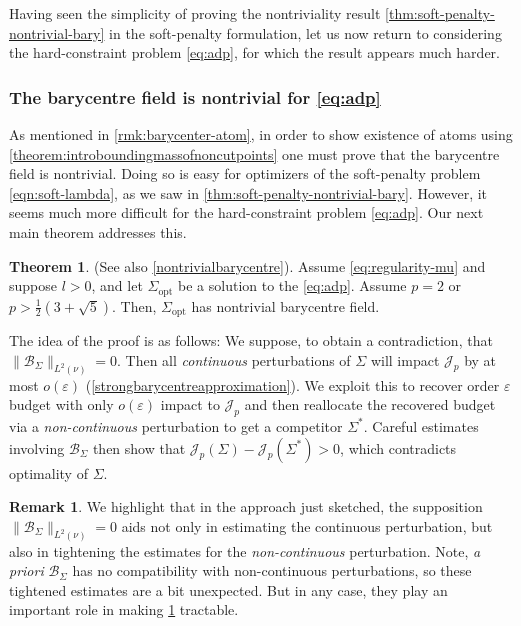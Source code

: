 \documentclass[preprint, reqno]{amsart}
\newcommand{\lbonpval}{\frac{1}{2}(3+\sqrt{5})}
\theoremstyle{definition}
\newtheorem{theorem}[definition]{Theorem}
\newtheorem{remark}[definition]{Remark}
\numberwithin{equation}{section}
\begin{document}
Having seen the simplicity of proving the nontriviality result
\cref{thm:soft-penalty-nontrivial-bary} in the soft-penalty
formulation, let us now return to considering the hard-constraint
problem \eqref{eq:adp}, for which the result appears much harder.


\subsubsection{The barycentre field is
  nontrivial for \eqref{eq:adp}} \label{sec:bary-nontrivial-summary}

As mentioned in \cref{rmk:barycenter-atom}, in order to show existence
of atoms using \cref{theorem:introboundingmassofnoncutpoints} one must
prove that the barycentre field is nontrivial. Doing so is easy for
optimizers of the soft-penalty problem \eqref{eqn:soft-lambda}, as we
saw in \cref{thm:soft-penalty-nontrivial-bary}. However, it seems much
more difficult for the hard-constraint problem \eqref{eq:adp}. Our
next main theorem addresses this.
\begin{theorem}\label{theorem:intronontrivialbarycentre} (See also
  \cref{nontrivialbarycentre}). Assume \eqref{eq:regularity-mu} and
  suppose $l > 0$, and let $\Sigma_{\mathrm{opt}}$ be a solution to
  the \eqref{eq:adp}. Assume $p = 2$ or $p > \lbonpval$. Then,
  $\Sigma_{\mathrm{opt}}$ has nontrivial barycentre field.
\end{theorem}

The idea of the proof is as follows: We suppose, to obtain a
contradiction, that $\lVert \mathcal B_\Sigma \rVert_{L^2(\nu)} = 0$.
Then all \emph{continuous} perturbations of $\Sigma$ will impact
$\mathscr J_p$ by at most $o(\varepsilon)$
(\cref{strongbarycentreapproximation}). We exploit this to recover
order $\varepsilon$ budget with only $o(\varepsilon)$ impact to
$\mathscr J_p$ and then reallocate the recovered budget via a
\emph{non-continuous} perturbation to get a competitor $\Sigma^*$.
Careful estimates involving $\mathcal B_\Sigma$ then show that
$\mathscr J_p(\Sigma) - \mathscr J_p(\Sigma^*) > 0$, which contradicts
optimality of $\Sigma$.
\begin{remark}
  We highlight that in the approach just sketched, the supposition
  $\lVert \mathcal B_\Sigma \rVert_{L^2(\nu)} = 0$ aids not only in
  estimating the continuous perturbation, but also in tightening the
  estimates for the \emph{non-continuous} perturbation. Note, \emph{a
    priori} $\mathcal B_\Sigma$ has no compatibility with
  non-continuous perturbations, so these tightened estimates are a bit
  unexpected. But in any case, they play an important role in making
  \cref{theorem:intronontrivialbarycentre} tractable.
\end{remark}
\end{document}

